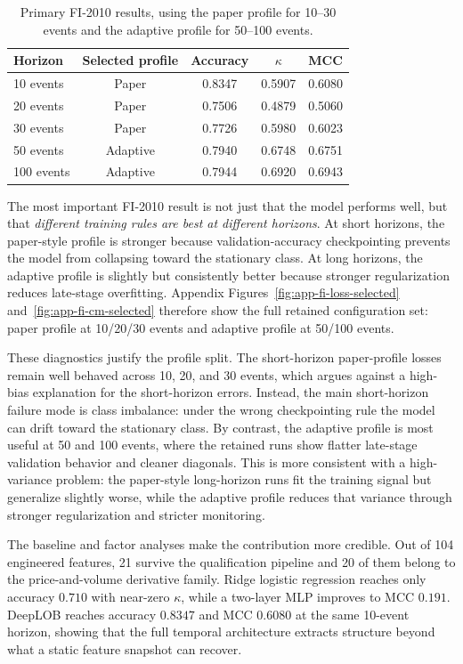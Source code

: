 \documentclass[11pt]{article}
\begin{document}
\begin{table}[H]
\centering
\caption{Primary FI-2010 results, using the paper profile for 10--30 events and the adaptive profile for 50--100 events.}
\label{tab:fi-primary}
\begin{tabular}{lcccc}
\toprule
Horizon & Selected profile & Accuracy & $\kappa$ & MCC \\
\midrule
10 events & Paper & 0.8347 & 0.5907 & 0.6080 \\
20 events & Paper & 0.7506 & 0.4879 & 0.5060 \\
30 events & Paper & 0.7726 & 0.5980 & 0.6023 \\
50 events & Adaptive & 0.7940 & 0.6748 & 0.6751 \\
100 events & Adaptive & 0.7944 & 0.6920 & 0.6943 \\
\bottomrule
\end{tabular}
\end{table}

The most important FI-2010 result is not just that the model performs well, but that \emph{different training rules are best at different horizons}. At short horizons, the paper-style profile is stronger because validation-accuracy checkpointing prevents the model from collapsing toward the stationary class. At long horizons, the adaptive profile is slightly but consistently better because stronger regularization reduces late-stage overfitting. Appendix Figures~\ref{fig:app-fi-loss-selected} and~\ref{fig:app-fi-cm-selected} therefore show the full retained configuration set: paper profile at 10/20/30 events and adaptive profile at 50/100 events.

These diagnostics justify the profile split. The short-horizon paper-profile losses remain well behaved across 10, 20, and 30 events, which argues against a high-bias explanation for the short-horizon errors. Instead, the main short-horizon failure mode is class imbalance: under the wrong checkpointing rule the model can drift toward the stationary class. By contrast, the adaptive profile is most useful at 50 and 100 events, where the retained runs show flatter late-stage validation behavior and cleaner diagonals. This is more consistent with a high-variance problem: the paper-style long-horizon runs fit the training signal but generalize slightly worse, while the adaptive profile reduces that variance through stronger regularization and stricter monitoring.

The baseline and factor analyses make the contribution more credible. Out of 104 engineered features, 21 survive the qualification pipeline and 20 of them belong to the price-and-volume derivative family. Ridge logistic regression reaches only accuracy $0.710$ with near-zero $\kappa$, while a two-layer MLP improves to MCC $0.191$. DeepLOB reaches accuracy $0.8347$ and MCC $0.6080$ at the same 10-event horizon, showing that the full temporal architecture extracts structure beyond what a static feature snapshot can recover.
\end{document}
